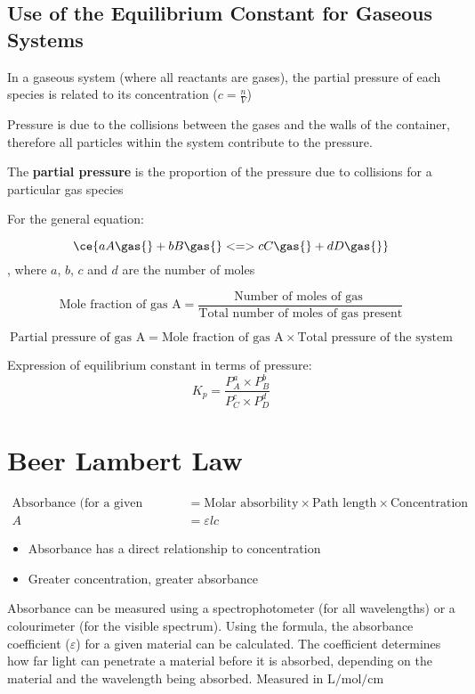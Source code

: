 	\subsection{Use of the Equilibrium Constant for Gaseous Systems}
		In a gaseous system (where all reactants are gases), the partial pressure of each species is related to its concentration ($c = \frac{n}{V}$)

		Pressure is due to the collisions between the gases and the walls of the container, therefore all particles within the system contribute to the pressure.

		The \textbf{partial pressure} is the proportion of the pressure due to collisions for a particular gas species

		For the general equation:

		$$\ce{aA \gas{} + bB \gas{} <=> cC \gas{} + dD \gas{}}$$, where $a$, $b$, $c$ and $d$ are the number of moles

		$$\text{Mole fraction of gas A} = \frac{\text{Number of moles of gas }}{\text{Total number of moles of gas present}}$$

		$$\text{Partial pressure of gas A} = \text{Mole fraction of gas A} \times \text{Total pressure of the system}$$

		Expression of equilibrium constant in terms of pressure:
		$$K_p = \frac{P^a_A \times P^b_B}{P^c_C \times P^d_D}$$

\section{Beer Lambert Law} \label{14/11/2024}
	\begin{align*}
		\text{Absorbance (for a given wavelength)} &= \text{Molar absorbility} \times \text{Path length} \times \text{Concentration} \\
		A &= \varepsilon lc
	\end{align*}
	\begin{itemize}
		\item Absorbance has a direct relationship to concentration
		\item Greater concentration, greater absorbance
	\end{itemize}

	Absorbance can be measured using a spectrophotometer (for all wavelengths) or a colourimeter (for the visible spectrum). Using the formula, the absorbance coefficient ($\varepsilon$) for a given material can be calculated. The coefficient determines how far light can penetrate a material before it is absorbed, depending on the material and the wavelength being absorbed. Measured in $\unit{\L\per\mole\per\cm}$

